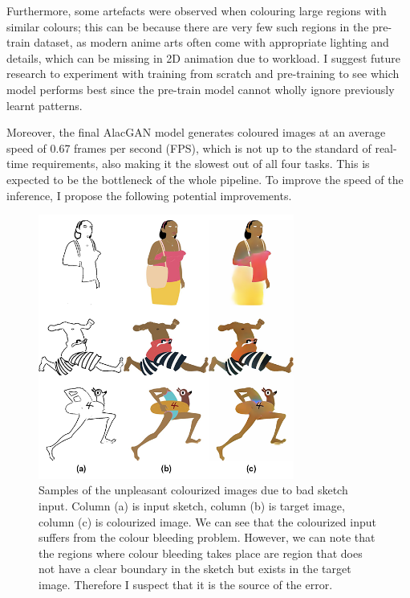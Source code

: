 Furthermore, some artefacts were observed when colouring large regions with similar colours; this can be because there are very few such regions in the pre-train dataset, as modern anime arts often come with appropriate lighting and details, which can be missing in 2D animation due to workload. I suggest future research to experiment with training from scratch and pre-training to see which model performs best since the pre-train model cannot wholly ignore previously learnt patterns.

Moreover, the final AlacGAN model generates coloured images at an average speed of 0.67 frames per second (FPS), which is not up to the standard of real-time requirements, also making it the slowest out of all four tasks. This is expected to be the bottleneck of the whole pipeline. To improve the speed of the inference, I propose the following potential improvements.

\begin{figure}
    \centering
    \includegraphics[width=0.75\textwidth]{images/colorization/bad-sketch-colourization.png}
    \caption[Samples of the unpleasant colourized images due to bad sketch input.]{Samples of the unpleasant colourized images due to bad sketch input. Column (a) is input sketch, column (b) is target image, column (c) is colourized image. We can see that the colourized input suffers from the colour bleeding problem. However, we can note that the regions where colour bleeding takes place are region that does not have a clear boundary in the sketch but exists in the target image. Therefore I suspect that it is the source of the error.}
    \label{fig:bad-sketch-colourization}
\end{figure}


